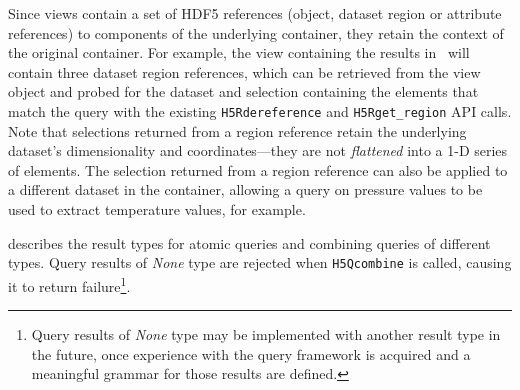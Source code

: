 Since views contain a set of HDF5 references (object,
dataset region or attribute references) to components of the underlying
container, they retain the context of the original container. For example, the
view containing the results in~ will contain three
dataset region references, which
can be retrieved from the view object and probed for the dataset and selection
containing the elements that match the query with the existing \texttt{H5Rdereference}
and \texttt{H5Rget\_region} API calls. Note that selections returned from a region
reference retain the underlying dataset's dimensionality and coordinates---they
are not \textit{flattened} into a 1-D series of elements. The selection returned
from a region reference can also be applied to a different dataset in the container,
allowing a query on pressure values to be used to extract temperature values,
for example.

 describes the result types for atomic queries and
combining queries of different types. Query results of \textit{None} type are rejected
when \texttt{H5Qcombine} is called, causing it to return failure\footnote{Query
results of \textit{None} type may be implemented with another result type in the
future, once experience with the query framework is acquired and a meaningful
grammar for those results are defined.}.

